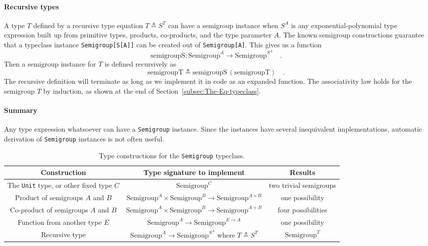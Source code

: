 \paragraph{Recursive types}

A type $T$ defined by a recursive type equation $T\triangleq S^{T}$
can have a semigroup instance when $S^{A}$ is any exponential-polynomial
type expression built up from primitive types, products, co-products,
and the type parameter $A$. The known semigroup constructions guarantee
that a typeclass instance \lstinline!Semigroup[S[A]]! can be created
out of \lstinline!Semigroup[A]!. This gives us a function 
\[
\text{semigroupS}:\text{Semigroup}^{A}\rightarrow\text{Semigroup}^{S^{A}}\quad.
\]
Then a semigroup instance for $T$ is defined recursively as
\[
\text{semigroupT}\triangleq\text{semigroupS}\,(\text{semigroupT})\quad.
\]
The recursive definition will terminate as long as we implement it
in code as an expanded function. The associativity law holds for the
semigroup $T$ by induction, as shown at the end of Section~\ref{subsec:The-Eq-typeclass}.

\paragraph{Summary}

Any type expression whatsoever can have a \lstinline!Semigroup! instance.
Since the instances have several inequivalent implementations, automatic
derivation of \lstinline!Semigroup! instances is not often useful.

\begin{table}
\begin{centering}
\begin{tabular}{|c|c|c|}
\hline 
\textbf{\footnotesize{}Construction} & \textbf{\footnotesize{}Type signature to implement} & \textbf{\footnotesize{}Results}\tabularnewline
\hline 
\hline 
{\footnotesize{}The }\lstinline!Unit!{\footnotesize{} type, or other
fixed type $C$} & {\footnotesize{}$\text{Semigroup}^{C}$} & {\footnotesize{}two trivial semigroups}\tabularnewline
\hline 
{\footnotesize{}Product of semigroups $A$ and $B$} & {\footnotesize{}$\text{Semigroup}^{A}\times\text{Semigroup}^{B}\rightarrow\text{Semigroup}^{A\times B}$} & {\footnotesize{}one possibility}\tabularnewline
\hline 
{\footnotesize{}Co-product of semigroups $A$ and $B$} & {\footnotesize{}$\text{Semigroup}^{A}\times\text{Semigroup}^{B}\rightarrow\text{Semigroup}^{A+B}$} & {\footnotesize{}four possibilities}\tabularnewline
\hline 
{\footnotesize{}Function from another type $E$} & {\footnotesize{}$\text{Semigroup}^{A}\rightarrow\text{Semigroup}^{E\rightarrow A}$} & {\footnotesize{}one possibility}\tabularnewline
\hline 
{\footnotesize{}Recursive type} & {\footnotesize{}$\text{Semigroup}^{A}\rightarrow\text{Semigroup}^{S^{A}}$
where $T\triangleq S^{T}$} & {\footnotesize{}$\text{Semigroup}^{T}$}\tabularnewline
\hline 
\end{tabular}
\par\end{centering}
\caption{Type constructions for the \lstinline!Semigroup! typeclass.\label{tab:Type-constructions-for-semigroup}}
\end{table}


